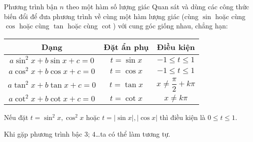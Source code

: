 \begin{dang}{Phương trình bận $ n $ theo một hàm số lượng giác}
	Quan sát và dùng các công thức biến đổi để đưa phương trình về cùng một hàm lượng giác (cùng $\sin$ hoặc cùng $\cos$ hoặc cùng $\tan$ hoặc cùng $\cot$) với cung góc giống nhau, chẳng hạn:
	\begin{center}
		\begin{tabular}{|c|c|c|}
			\hline
			Dạng & Đặt ẩn phụ & Điều kiện\\
			\hline
			$a\sin^2x+b\sin x+c=0$ & $t=\sin x$ & $-1\le t \le 1$\\
			\hline
			$a\cos^2x+b\cos x+c=0$ & $t=\cos x$ & $-1\le t \le 1$\\
			\hline
			$a\tan^2x+b\tan x+c=0$ & $t=\tan x$ & $x\ne\dfrac{\pi}{2}+k\pi$\\
			\hline
			$a\cot^2x+b\cot x+c=0$ & $t=\cot x$ & $x\ne k\pi$\\
			\hline
		\end{tabular}
	\end{center}
	Nếu đặt $t=\sin^2x,\cos^2x$ hoặc $t=|\sin x|,|\cos x|$ thì điều kiện là $0\le t\le 1$.
	\begin{nx}
		Khi gặp phương trình bậc $ 3 $; $ 4 $\ldots ta có thể làm tương tự.
	\end{nx}
\end{dang}
